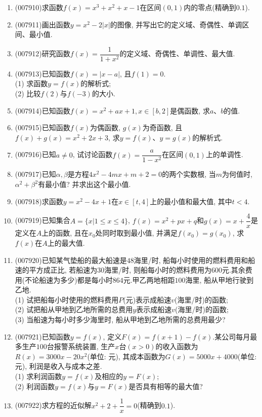\documentclass[10pt,a4paper]{article}
\begin{document}
\begin{enumerate}[1.]
\item {\tiny (007910)}求函数$f(x)=x^3+x^2+x-1$在区间$(0,1)$内的零点(精确到$0.1$).
\item {\tiny (007911)}画出函数$y=x^2-2|x|$的图像, 并写出它的定义域、奇偶性、单调区间、最小值.
\item {\tiny (007912)}研究函数$f(x)=\dfrac 1{1+x^2}$的定义域、奇偶性、单调性、最大值.
\item {\tiny (007913)}已知函数$f(x)=|x-a|$, 且$f(1)=0$.\\
(1) 求函数$y=f(x)$的解析式;\\
(2) 比较$f(2)$与$f(-3)$的大小.
\item {\tiny (007914)}已知函数$f(x)=x^2+ax+1,x\in [b,2]$是偶函数, 求$a$、$b$的值.
\item {\tiny (007915)}已知函数$f(x)$为偶函数, $g(x)$为奇函数, 且$f(x)+g(x)=x^2+2x+3$, 求$y=f(x)$、$y=g(x)$的解析式.
\item {\tiny (007916)}已知$a\ne 0$, 试讨论函数$f(x)=\dfrac a{1-x^2}$在区间$(0,1)$上的单调性.
\item {\tiny (007917)}已知$\alpha,\beta$是方程$4x^2-4mx+m+2=0$的两个实数根, 当$m$为何值时, $\alpha ^2+\beta ^2$有最小值? 并求出这个最小值.
\item {\tiny (007918)}求函数$y=x^2-4x+1$在$x\in [t,4]$上的最小值和最大值, 其中$t<4$.
\item {\tiny (007919)}已知集合$A=\{x|1\le x\le 4\}$, $f(x)=x^2+px+q$和$g(x)=x+\dfrac 4x$是定义在$A$上的函数, 且在$x_0$处同时取到最小值, 并满足$f(x_0)=g(x_0)$, 求$f(x)$在$A$上的最大值.
\item {\tiny (007920)}已知某气垫船的最大船速是$48$海里/时, 船每小时使用的燃料费用和船速的平方成正比, 若船速为$30$海里/时, 则船每小时的燃料费用为$600$元.其余费用(不论船速为多少)都是每小时$864$元.甲乙两地相距$100$海里, 船从甲地行驶到乙地.\\
(1) 试把船每小时使用的燃料费用$P$(元)表示成船速$v$(海里/时)的函数;\\
(2) 试把船从甲地到乙地所需的总费用$y$表示成船速$v$(海里/时)的函数;\\
(3) 当船速为每小时多少海里时, 船从甲地到乙地所需的总费用最少?
\item {\tiny (007921)}已知函数$y=f(x)$, 定义$F(x)=f(x+1)-f(x)$.某公司每月最多生产$100$台报警系统装置, 生产$x$台$(x>0)$的收入函数为$R(x)=3000x-20x^2$(单位: 元), 其成本函数为$G(x)=5000x+4000$(单位: 元), 利润是收入与成本之差.\\
(1) 求利润函数$y=f(x)$及相应的$y=F(x)$;\\
(2) 利润函数$y=f(x)$与$y=F(x)$是否具有相等的最大值?
\item {\tiny (007922)}求方程的近似解$x^2+2+\dfrac 1x=0$(精确到$0.1$).

\end{enumerate}
\end{document}
